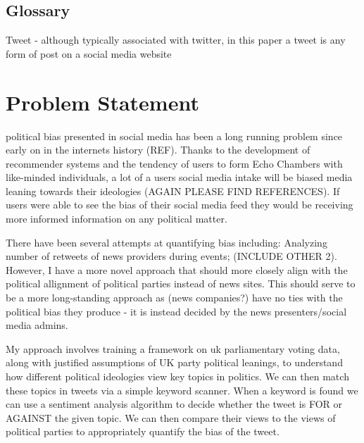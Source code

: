 \documentclass[a4paper,fleqn,12pt]{article}
\begin{document}


\pagestyle{plain}

\subsection{Glossary}
Tweet - although typically associated with twitter, in this paper a tweet is any form of post on a social media website

\section{Problem Statement}
political bias presented in social media has been a long running problem since early on in the internets history (REF). Thanks to the development of recommender systems and the tendency of users to form Echo Chambers with like-minded individuals, a lot of a users social media intake will be biased media leaning towards their ideologies (AGAIN PLEASE FIND REFERENCES). If users were able to see the bias of their social media feed they would be receiving more informed information on any political matter.

There have been several attempts at quantifying bias including: Analyzing number of retweets of news providers during events; (INCLUDE OTHER 2). However, I have a more novel approach that should more closely align with the political allignment of political parties instead of news sites. This should serve to be a more long-standing approach as (news companies?) have no ties with the political bias they produce - it is instead decided by the news presenters/social media admins.

My approach involves training a framework on uk parliamentary voting data, along with justified assumptions of UK party political leanings, to understand how different political ideologies view key topics in politics. We can then match these topics in tweets via a simple keyword scanner. When a keyword is found we can use a sentiment analysis algorithm to decide whether the tweet is FOR or AGAINST the given topic. We can then compare their views to the views of political parties to appropriately quantify the bias of the tweet.

\newpage
\end{document}
